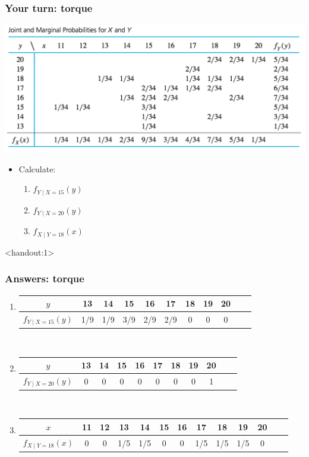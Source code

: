 \documentclass[handout]{beamer}\usepackage[]{graphicx}\usepackage[]{color}
\newcommand{\answers}{1}
\providecommand{\q}{$\quad$ \newline}
\numberwithin{equation}{section}
\begin{document}
\begin{frame}
\frametitle{Your turn: torque}
 \includegraphics{../../fig/torquetablemar.png}
\begin{itemize}
\item Calculate:
\begin{enumerate}[1. ]
\item $f_{Y \mid X = 15}(y)$
\item $f_{Y \mid X = 20}(y)$
\item $f_{X \mid Y = 18}(x)$
\end{enumerate}
\end{itemize}
\end{frame}

\begin{frame}<handout:\answers>
\frametitle{Answers: torque} \scriptsize
\begin{enumerate}[1. ]
\item 
\begin{tabular}{ccccccccccc}
$y$ & 13 & 14 & 15 & 16 & 17 & 18 & 19 & 20 \\ \hline
$f_{Y \mid X = 15}(y)$ & 1/9 & 1/9 & 3/9 & 2/9 & 2/9 & 0 & 0 & 0
\end{tabular} \q
\item 
\begin{tabular}{ccccccccccc}
$y$ & 13 & 14 & 15 & 16 & 17 & 18 & 19 & 20 \\ \hline
$f_{Y \mid X = 20}(y)$ & 0 & 0 & 0 & 0 & 0 & 0 & 0 & 1
\end{tabular} \q
\item 
\begin{tabular}{ccccccccccccc}
$x$ & 11 & 12 & 13 & 14 & 15 & 16 & 17 & 18 & 19 & 20 \\ \hline
$f_{X \mid Y = 18}(x)$ & 0 & 0 & 1/5 & 1/5 & 0 & 0 & 1/5 & 1/5 & 1/5 & 0
\end{tabular} \q
\end{enumerate}
\end{frame}
\end{document}
